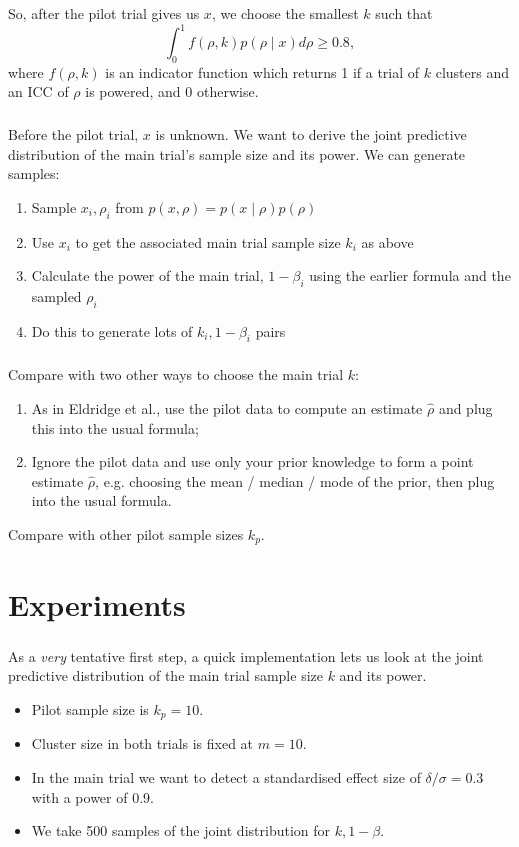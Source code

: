 \documentclass{beamer}
\begin{document}
\begin{frame}
\frametitle{}
So, after the pilot trial gives us $x$, we choose the smallest $k$ such that
\begin{equation}
\int_{0}^{1} f(\rho, k)p(\rho \mid x) d\rho \geq 0.8,
\end{equation}
where $f(\rho, k)$ is an indicator function which returns 1 if a trial of $k$ clusters and an ICC of $\rho$ is powered, and 0 otherwise.
\end{frame}

\begin{frame}
\frametitle{}
Before the pilot trial, $x$ is unknown. We want to derive the joint predictive distribution of the main trial's sample size and its power. We can generate samples:
\begin{enumerate}
\item Sample $x_{i}, \rho_{i}$ from $p(x, \rho) = p(x \mid \rho) p(\rho)$
\item Use $x_{i}$ to get the associated main trial sample size $k_{i}$ as above
\item Calculate the power of the main trial, $1-\beta_{i}$ using the earlier formula and the sampled $\rho_{i}$
\item Do this to generate lots of $k_{i}, 1-\beta_{i}$ pairs
\end{enumerate}
\end{frame}

\begin{frame}
\frametitle{}
Compare with two other ways to choose the main trial $k$:
\begin{enumerate}
\item As in Eldridge et al., use the pilot data to compute an estimate $\hat{\rho}$ and plug this into the usual formula;
\item Ignore the pilot data and use only your prior knowledge to form a point estimate $\hat{\rho}$, e.g. choosing the mean /  median / mode of the prior, then plug into the usual formula.
\end{enumerate}
Compare with other pilot sample sizes $k_{p}$.
\end{frame}

\section{Experiments}

\begin{frame}
\frametitle{}
As a \emph{very} tentative first step, a quick implementation lets us look at the joint predictive distribution of the main trial sample size $k$ and its power.
\begin{itemize}
\item Pilot sample size is $k_{p} = 10$.
\item Cluster size in both trials is fixed at $m = 10$.
\item In the main trial we want to detect a standardised effect size of $\delta/\sigma = 0.3$ with a power of 0.9.
\item We take 500 samples of the joint distribution for $k, 1-\beta$.
\end{itemize}
\end{frame}
\end{document}
